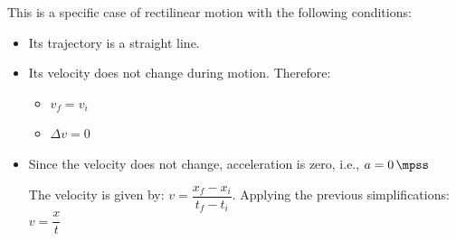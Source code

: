 This is a specific case of rectilinear motion with the following conditions:
\begin{itemize}
    \item Its trajectory is a straight line.
    \item Its velocity does not change during motion. Therefore:
    \begin{itemize}
        \item \( v_f = v_i \)
        \item \( \Delta v = 0 \)
    \end{itemize}
    \item Since the velocity does not change, acceleration is zero, i.e., \( a = \qty{0}{\mpss} \)

    \begin{theorem}[]
        The velocity is given by: $v = \dfrac{x_f - x_i}{t_f-t_i}$. Applying the previous simplifications: \(  v = \dfrac{x}{t}  \)

    \end{theorem}
\end{itemize}



